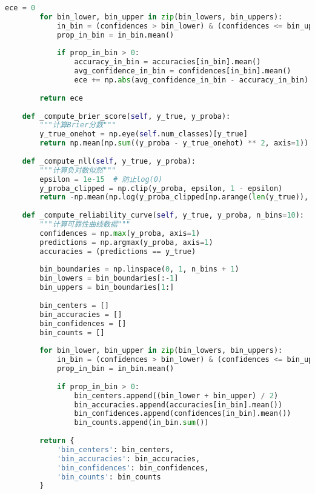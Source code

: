 \begin{lstlisting}[language=Python,caption=综合评估指标实现]
        ece = 0
        for bin_lower, bin_upper in zip(bin_lowers, bin_uppers):
            in_bin = (confidences > bin_lower) & (confidences <= bin_upper)
            prop_in_bin = in_bin.mean()
            
            if prop_in_bin > 0:
                accuracy_in_bin = accuracies[in_bin].mean()
                avg_confidence_in_bin = confidences[in_bin].mean()
                ece += np.abs(avg_confidence_in_bin - accuracy_in_bin) * prop_in_bin
        
        return ece
    
    def _compute_brier_score(self, y_true, y_proba):
        """计算Brier分数"""
        y_true_onehot = np.eye(self.num_classes)[y_true]
        return np.mean(np.sum((y_proba - y_true_onehot) ** 2, axis=1))
    
    def _compute_nll(self, y_true, y_proba):
        """计算负对数似然"""
        epsilon = 1e-15  # 防止log(0)
        y_proba_clipped = np.clip(y_proba, epsilon, 1 - epsilon)
        return -np.mean(np.log(y_proba_clipped[np.arange(len(y_true)), y_true]))
    
    def _compute_reliability_curve(self, y_true, y_proba, n_bins=10):
        """计算可靠性曲线数据"""
        confidences = np.max(y_proba, axis=1)
        predictions = np.argmax(y_proba, axis=1)
        accuracies = (predictions == y_true)
        
        bin_boundaries = np.linspace(0, 1, n_bins + 1)
        bin_lowers = bin_boundaries[:-1]
        bin_uppers = bin_boundaries[1:]
        
        bin_centers = []
        bin_accuracies = []
        bin_confidences = []
        bin_counts = []
        
        for bin_lower, bin_upper in zip(bin_lowers, bin_uppers):
            in_bin = (confidences > bin_lower) & (confidences <= bin_upper)
            prop_in_bin = in_bin.mean()
            
            if prop_in_bin > 0:
                bin_centers.append((bin_lower + bin_upper) / 2)
                bin_accuracies.append(accuracies[in_bin].mean())
                bin_confidences.append(confidences[in_bin].mean())
                bin_counts.append(in_bin.sum())
        
        return {
            'bin_centers': bin_centers,
            'bin_accuracies': bin_accuracies,
            'bin_confidences': bin_confidences,
            'bin_counts': bin_counts
        }
\end{lstlisting}

